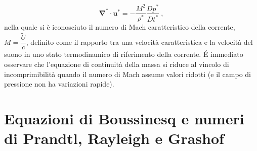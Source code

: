 \begin{equation}
 \bm{\nabla}^* \cdot \bm{u}^* = -  \dfrac{M^2}{\rho^*} \dfrac{D p^*}{D t^*} \ ,
\end{equation}
nella quale si è iconosciuto il numero di Mach caratteristico della corrente, $M = \dfrac{\tilde{U}}{c}$, definito come il rapporto tra una velocità caratteristica e la velocità del suono in uno stato termodinamico di riferimento della corrente.
\'E immediato osservare che l'equazione di continuità della massa si riduce al vincolo di incomprimibilità quando il numero di Mach assume valori ridotti (e il campo di pressione non ha variazioni rapide).

\section{Equazioni di Boussinesq e numeri di Prandtl, Rayleigh e Grashof}

